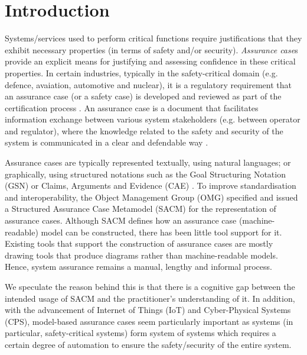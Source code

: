 \section{Introduction}
Systems/services used to perform critical functions require justifications that they exhibit necessary properties (in terms of safety and/or security). \textit{Assurance case}s provide an explicit means for justifying and assessing confidence in these critical properties. In certain industries, typically in the safety-critical domain (e.g. defence, avaiation, automotive and nuclear), it is a regulatory requirement that an assurance case (or a safety case) is developed and reviewed as part of the certification process \cite{healthFound}.
An assurance case is a document that facilitates information exchange between various system stakeholders (e.g. between operator and regulator), where the knowledge related to the safety and security of the system is communicated in a clear and defendable way \cite{}. 

Assurance cases are typically represented textually, using natural languages; or graphically, using structured notations such as the Goal Structuring Notation (GSN) \cite{} or Claims, Arguments and Evidence (CAE) \cite{}. 
To improve standardisation and interoperability, the Object Management Group (OMG) specified and issued a Structured Assurance Case Metamodel (SACM) for the representation of assurance cases. 
Although SACM defines how an assurance case (machine-readable) model can be constructed, there has been little tool support for it. Existing tools that support the construction of assurance cases are mostly drawing tools that produce diagrams rather than machine-readable models. 
Hence, system assurance remains a manual, lengthy and informal process.

We speculate the reason behind this is that there is a cognitive gap between the intended usage of SACM and the practitioner's understanding of it. 
In addition, with the advancement of Internet of Things (IoT) and Cyber-Physical Systems (CPS), model-based assurance cases seem particularly important as systems (in particular, safety-critical systems) form system of systems which requires a certain degree of automation to ensure the safety/security of the entire system. 




